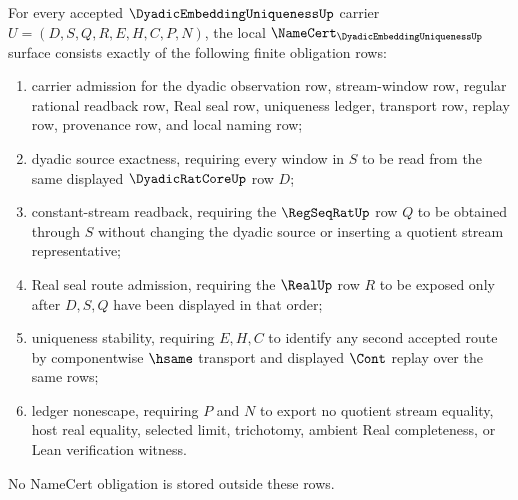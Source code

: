 \begin{theorem}
\label{thm:dyadic-embedding-uniqueness-namecert-obligations}
For every accepted $\DyadicEmbeddingUniquenessUp$ carrier $U=(D,S,Q,R,E,H,C,P,N)$, the local $\NameCert_{\DyadicEmbeddingUniquenessUp}$ surface consists exactly of the following finite obligation rows:
\begin{enumerate}
\item carrier admission for the dyadic observation row, stream-window row, regular rational readback row, Real seal row, uniqueness ledger, transport row, replay row, provenance row, and local naming row;
\item dyadic source exactness, requiring every window in $S$ to be read from the same displayed $\DyadicRatCoreUp$ row $D$;
\item constant-stream readback, requiring the $\RegSeqRatUp$ row $Q$ to be obtained through $S$ without changing the dyadic source or inserting a quotient stream representative;
\item Real seal route admission, requiring the $\RealUp$ row $R$ to be exposed only after $D,S,Q$ have been displayed in that order;
\item uniqueness stability, requiring $E,H,C$ to identify any second accepted route by componentwise $\hsame$ transport and displayed $\Cont$ replay over the same rows;
\item ledger nonescape, requiring $P$ and $N$ to export no quotient stream equality, host real equality, selected limit, trichotomy, ambient Real completeness, or Lean verification witness.
\end{enumerate}
No NameCert obligation is stored outside these rows.
\end{theorem}

